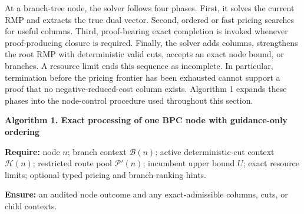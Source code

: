 \documentclass[
  11pt,
]{article}
\begin{document}
At a branch-tree node, the solver follows four phases. First, it solves
the current RMP and extracts the true dual vector. Second, ordered or
fast pricing searches for useful columns. Third, proof-bearing exact
completion is invoked whenever proof-producing closure is required.
Finally, the solver adds columns, strengthens the root RMP with
deterministic valid cuts, accepts an exact node bound, or branches. A
resource limit ends this sequence as incomplete. In particular,
termination before the pricing frontier has been exhausted cannot
support a proof that no negative-reduced-cost column exists. Algorithm 1
expands these phases into the node-control procedure used throughout
this section.

\textbf{Algorithm 1. Exact processing of one BPC node with guidance-only
ordering}

\textbf{Require:} node \(n\); branch context \(\mathcal{B}(n)\); active
deterministic-cut context \(\mathcal{H}(n)\); restricted route pool
\(\mathcal{P}'(n)\); incumbent upper bound \(U\); exact resource limits;
optional typed pricing and branch-ranking hints.

\textbf{Ensure:} an audited node outcome and any exact-admissible
columns, cuts, or child contexts.
\end{document}
